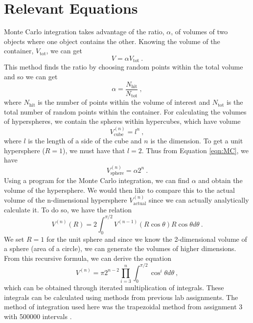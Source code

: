 \documentclass[aps,prl,twocolumn,superscriptaddress]{revtex4-1}
\begin{document}
\section{Relevant Equations}
Monte Carlo integration takes advantage of the ratio, $\alpha$, of volumes of two objects where one object contains the other. Knowing the volume of the container, $V_{\text{tot}}$, we can get \cite{Laulima}
\begin{equation}
V = \alpha V_{\text{tot}}~. \label{eqn:MC}
\end{equation}
This method finds the ratio by choosing random points within the total volume and so we can get
\begin{equation}
\alpha = \frac{N_{\text{hit}}}{N_{\text{tot}}} ~, \label{eqn:ratio}
\end{equation}
where $N_{\text{hit}}$ is the number of points within the volume of interest and $N_{\text{tot}}$ is the total number of random points within the container.
For calculating the volumes of hyperspheres, we contain the spheres within hypercubes, which have volume
\begin{equation}
V^{(n)}_{\text{cube}} = l^n ~, \label{eqn:cube}
\end{equation}
where $l$ is the length of a side of the cube and $n$ is the dimension. To get a unit hypersphere ($R = 1$), we must have that $l = 2$. Thus from Equation \ref{eqn:MC}, we have
\begin{equation}
V^{(n)}_{\text{sphere}} = \alpha 2^n ~. \label{eqn:MCSphere}
\end{equation}
Using a program for the Monte Carlo integration, we can find $\alpha$ and obtain the volume of the hypersphere. 
We would then like to compare this to the actual volume of the n-dimensional hypersphere
$V^{(n)}_{\text{actual}}$ since we can actually analytically calculate it. To do so, we have the relation \cite{vtrue}
\begin{equation}
V^{(n)}(R) = 2 \int_0^{\pi/2} V^{(n-1)}(R\cos\theta) R\cos\theta d\theta ~. \label{eqn:recursive}
\end{equation}
We set $R=1$ for the unit sphere and since we know the 2-dimensional volume of a sphere (area of a circle), we can generate the volumes of higher dimensions. From this recursive formula, we can derive the equation
\begin{equation}
V^{(n)} = \pi 2^{n-2} \prod^n_{i = 3} \int_0^{\pi/2} \cos^i \theta d\theta ~, \label{eqn:Vtrue}
\end{equation}
which can be obtained through iterated multiplication of integrals. These integrals can be calculated using methods from previous lab assignments. The method of integration used here was the trapezoidal method from assignment 3 with 500000 intervals \cite{integ}.
\end{document}
